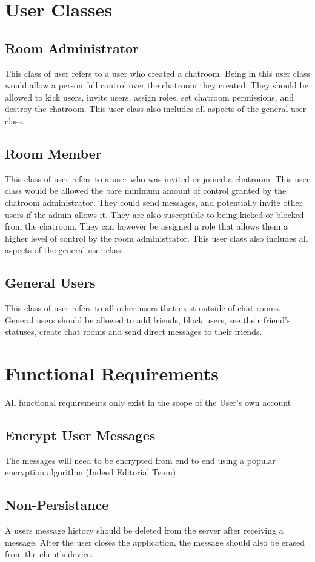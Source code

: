\documentclass[11pt]{article}
\theoremstyle{plain}
\theoremstyle{definition}
\begin{document}
\section{User Classes}\label{sec:userclasses}

\subsection{Room Administrator}
This class of user refers to a user who created a chatroom. Being in this user class would allow a person full control over the chatroom they created. They should be allowed to kick users, invite users, assign roles, set chatroom permissions, and destroy the chatroom. This user class also includes all aspects of the general user class. 
\subsection{Room Member}
This class of user refers to a user who was invited or joined a chatroom. This user class would be allowed the bare minimum amount of control granted by the chatroom administrator. They could send messages, and potentially invite other users if the admin allows it. They are also susceptible to being kicked or blocked from the chatroom. They can however be assigned a role that allows them a higher level of control by the room administrator.  This user class also includes all aspects of the general user class. 
\subsection{General Users}
This class of user refers to all other users that exist outside of chat rooms. General users should be allowed to add friends, block users, see their friend's statuses, create chat rooms and send direct messages to their friends.

\section{Functional Requirements}\label{sec:funcrequirements}
All functional requirements only exist in the scope of the User's own account
\subsection{Encrypt User Messages}
The messages will need to be encrypted from end to end using a popular encryption algorithm (Indeed Editorial Team)
\subsection{Non-Persistance}
A users message history should be deleted from the server after receiving a message. After the user closes the application, the message should also be erased from the client's device.
\end{document}
